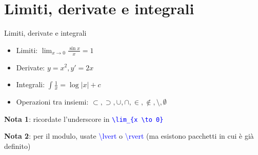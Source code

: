 \section{Limiti, derivate e integrali}
  \begin{frame}{Limiti, derivate e integrali}
    
    \begin{itemize}
      \item<1-> Limiti: $\lim_{x \to 0} \frac{\sin x}{x} = 1$
      \item<2-> Derivate: $y = x^2, y' = 2x$
      \item<3-> Integrali: $\int \frac{1}{x} = \log \lvert x \rvert + c$
      \item<4-> Operazioni tra insiemi: $\subset, \supset, \cup, \cap, \in, \notin, \setminus, \emptyset$
    \end{itemize}
    
    \textbf{Nota 1}: ricordate l'underscore in \texttt{\textcolor{blue}{\textbackslash lim\_\{x \textbackslash to 0\}}}

    \textbf{Nota 2}: per il modulo, usate \textcolor{blue}{\textbackslash lvert} o \textcolor{blue}{\textbackslash rvert} (ma esistono pacchetti in cui è già definito)

\end{frame}
